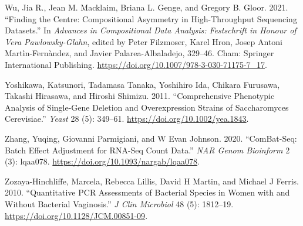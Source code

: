 \documentclass[
]{article}
\newlength{\cslhangindent}
\newlength{\cslentryspacingunit} %
\newenvironment{CSLReferences}[2] %
 {%
  \setlength{\parindent}{0pt}
  \ifodd #1
  \let\oldpar\par
  \def\par{\hangindent=\cslhangindent\oldpar}
  \fi
  \setlength{\parskip}{#2\cslentryspacingunit}
 }%
 {}
\begin{document}
\begin{CSLReferences}{1}{0}
\leavevmode{}%
Wu, Jia R., Jean M. Macklaim, Briana L. Genge, and Gregory B. Gloor.
2021. {``Finding the Centre: Compositional Asymmetry in High-Throughput
Sequencing Datasets.''} In \emph{Advances in Compositional Data
Analysis: Festschrift in Honour of Vera Pawlowsky-Glahn}, edited by
Peter Filzmoser, Karel Hron, Josep Antoni Martìn-Fernàndez, and Javier
Palarea-Albaladejo, 329--46. Cham: Springer International Publishing.
\url{https://doi.org/10.1007/978-3-030-71175-7_17}.

\leavevmode{}%
Yoshikawa, Katsunori, Tadamasa Tanaka, Yoshihiro Ida, Chikara Furusawa,
Takashi Hirasawa, and Hiroshi Shimizu. 2011. {``Comprehensive Phenotypic
Analysis of Single-Gene Deletion and Overexpression Strains of
Saccharomyces Cerevisiae.''} \emph{Yeast} 28 (5): 349--61.
\url{https://doi.org/10.1002/yea.1843}.

\leavevmode{}%
Zhang, Yuqing, Giovanni Parmigiani, and W Evan Johnson. 2020.
{``ComBat-Seq: Batch Effect Adjustment for RNA-Seq Count Data.''}
\emph{NAR Genom Bioinform} 2 (3): lqaa078.
\url{https://doi.org/10.1093/nargab/lqaa078}.

\leavevmode{}%
Zozaya-Hinchliffe, Marcela, Rebecca Lillis, David H Martin, and Michael
J Ferris. 2010. {``Quantitative PCR Assessments of Bacterial Species in
Women with and Without Bacterial Vaginosis.''} \emph{J Clin Microbiol}
48 (5): 1812--19. \url{https://doi.org/10.1128/JCM.00851-09}.

\end{CSLReferences}
\end{document}
